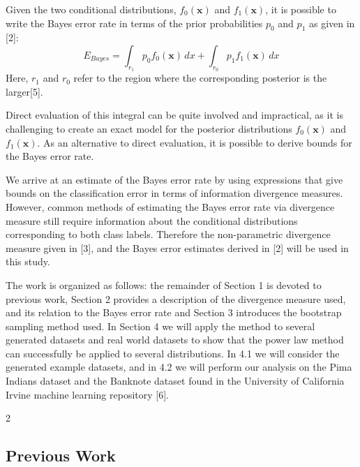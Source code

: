 \documentclass{article}
\begin{document}
		Given the two conditional distributions, $f_0(\textbf{x})$ and $f_1(\textbf{x})$, it is possible to write the Bayes error rate in terms of the prior probabilities $p_0$ and $p_1$ as given in [2]:
		\begin{equation} E_{Bayes}=\int_{r_1} p_0f_0(\textbf{x}) \,dx + \int_{r_0} p_1f_1(\textbf{x}) \,dx	\end{equation}
		Here, $r_1$ and $r_0$ refer to the region where the corresponding posterior is the larger[5].
		
		
		Direct evaluation of this integral can be quite involved and impractical, as it is challenging to create an exact model for the posterior distributions $f_0(\textbf{x})$ and $f_1(\textbf{x})$. As an alternative to direct evaluation, it is possible to derive bounds for the Bayes error rate.
		
		
		We arrive at an estimate of the Bayes error rate by using expressions that give bounds on the classification error in terms of information divergence measures. However, common methods of estimating the Bayes error rate via divergence measure still require information about the conditional distributions corresponding to both class labels. Therefore the non-parametric divergence measure given in [3], and the Bayes error estimates derived in [2] will be used in this study.     
		
		
		The work is organized as follows: the remainder of Section 1 is devoted to previous work, Section 2 provides a description of the divergence measure used, and its relation to the Bayes error rate and Section 3 introduces the bootstrap sampling method used. In Section 4 we will apply the method to several generated datasets and real world datasets to show that the power law method can successfully be applied to several distributions. In 4.1 we will consider the generated example datasets, and in 4.2 we will perform our analysis on the Pima Indians dataset and the Banknote dataset found in the University of California Irvine machine learning repository [6].
		
		
		2
		\subsection*{\small Previous Work}	
		
		
\end{document}
